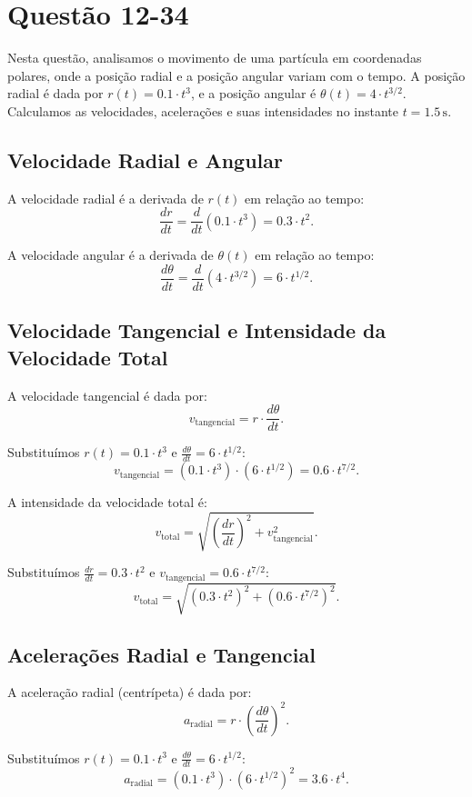 \section{Questão 12-34}

Nesta questão, analisamos o movimento de uma partícula em coordenadas polares, onde a posição radial e a posição angular variam com o tempo. A posição radial é dada por \(r(t) = 0.1 \cdot t^3\), e a posição angular é \( \theta(t) = 4 \cdot t^{3/2}\). Calculamos as velocidades, acelerações e suas intensidades no instante \(t = 1.5 \, \text{s}\).

\subsection*{Velocidade Radial e Angular}
A velocidade radial é a derivada de \(r(t)\) em relação ao tempo:
\[
\frac{dr}{dt} = \frac{d}{dt}\left(0.1 \cdot t^3\right) = 0.3 \cdot t^2.
\]

A velocidade angular é a derivada de \(\theta(t)\) em relação ao tempo:
\[
\frac{d\theta}{dt} = \frac{d}{dt}\left(4 \cdot t^{3/2}\right) = 6 \cdot t^{1/2}.
\]

\subsection*{Velocidade Tangencial e Intensidade da Velocidade Total}
A velocidade tangencial é dada por:
\[
v_{\text{tangencial}} = r \cdot \frac{d\theta}{dt}.
\]

Substituímos \(r(t) = 0.1 \cdot t^3\) e \(\frac{d\theta}{dt} = 6 \cdot t^{1/2}\):
\[
v_{\text{tangencial}} = \left(0.1 \cdot t^3\right) \cdot \left(6 \cdot t^{1/2}\right) = 0.6 \cdot t^{7/2}.
\]

A intensidade da velocidade total é:
\[
v_{\text{total}} = \sqrt{\left(\frac{dr}{dt}\right)^2 + v_{\text{tangencial}}^2}.
\]

Substituímos \(\frac{dr}{dt} = 0.3 \cdot t^2\) e \(v_{\text{tangencial}} = 0.6 \cdot t^{7/2}\):
\[
v_{\text{total}} = \sqrt{\left(0.3 \cdot t^2\right)^2 + \left(0.6 \cdot t^{7/2}\right)^2}.
\]

\subsection*{Acelerações Radial e Tangencial}
A aceleração radial (centrípeta) é dada por:
\[
a_{\text{radial}} = r \cdot \left(\frac{d\theta}{dt}\right)^2.
\]

Substituímos \(r(t) = 0.1 \cdot t^3\) e \(\frac{d\theta}{dt} = 6 \cdot t^{1/2}\):
\[
a_{\text{radial}} = \left(0.1 \cdot t^3\right) \cdot \left(6 \cdot t^{1/2}\right)^2 = 3.6 \cdot t^{4}.
\]

